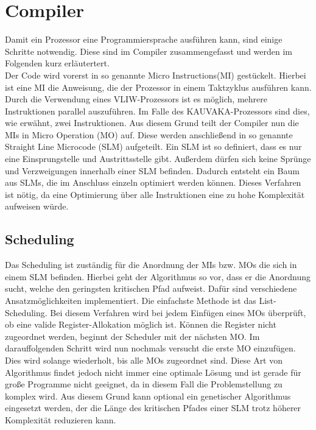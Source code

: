 \section{Compiler}
Damit ein Prozessor eine Programmiersprache ausführen kann, sind einige Schritte notwendig. Diese sind im Compiler zusammengefasst und werden im Folgenden kurz erläutertert.\\
Der Code wird vorerst in so genannte \glqq Micro Instructions\grqq{ }(MI) gestückelt. Hierbei ist eine MI die Anweisung, die der Prozessor in einem Taktzyklus ausführen kann. Durch die Verwendung eines VLIW-Prozessors ist es möglich, mehrere Instruktionen parallel auszuführen. Im Falle des KAUVAKA-Prozessors sind dies, wie erwähnt, zwei Instruktionen. Aus diesem Grund teilt der Compiler nun die MIs in \glqq Micro Operation \grqq{ }(MO) auf. Diese werden anschließend in so genannte \glqq Straight Line Microcode\grqq{} (SLM) aufgeteilt. Ein SLM ist so definiert, dass es nur eine Einsprungstelle und Austrittsstelle gibt. Außerdem dürfen sich keine Sprünge und Verzweigungen innerhalb einer SLM befinden.  Dadurch entsteht ein Baum aus SLMs, die im Anschluss einzeln optimiert werden können. Dieses Verfahren ist nötig, da eine Optimierung über alle Instruktionen eine zu hohe Komplexität aufweisen würde. \cite{landskov1980local}
\subsection{Scheduling}
\label{sec:scheduling}
Das Scheduling ist zuständig für die Anordnung der MIs bzw. MOs die sich in einem SLM befinden. Hierbei geht der Algorithmus so vor, dass er die Anordnung sucht, welche den geringsten kritischen Pfad aufweist. Dafür sind verschiedene Ansatzmöglichkeiten implementiert. Die einfachste Methode ist das List-Scheduling. Bei diesem Verfahren wird bei jedem Einfügen eines MOs überprüft, ob eine valide Register-Allokation möglich ist. Können die Register nicht zugeordnet werden, beginnt der Scheduler mit der nächsten MO. Im darauffolgenden Schritt wird nun nochmals versucht die erste MO einzufügen. Dies wird solange wiederholt, bis alle MOs zugeordnet sind.\cite{landskov1980local}
Diese Art von Algorithmus findet jedoch nicht immer eine optimale Lösung und ist gerade für große Programme nicht geeignet, da in diesem Fall die Problemstellung zu komplex wird. Aus diesem Grund kann optional ein genetischer Algorithmus eingesetzt werden, der die Länge des kritischen Pfades einer SLM trotz höherer Komplexität reduzieren kann.


